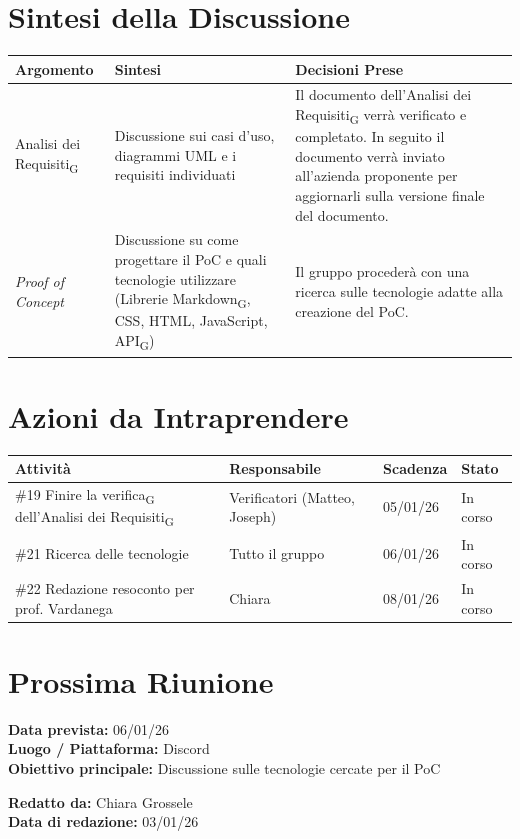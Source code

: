\documentclass[a4paper,12pt]{article}
\newcommand{\gls}[1]{#1\textsubscript{G}}
\begin{document}
\section*{ Sintesi della Discussione}

\begin{longtable}{|p{}|p{}|p{}|}
\hline
\textbf{Argomento} & \textbf{Sintesi} & \textbf{Decisioni Prese} \\ \hline
\gls{Analisi dei Requisiti} & Discussione sui casi d'uso, diagrammi UML e i requisiti individuati& Il documento dell'\gls{Analisi dei Requisiti} verrà verificato e completato. In seguito il documento verrà inviato all'azienda proponente per aggiornarli sulla versione finale del documento. \\ \hline
\textit{Proof of Concept} & Discussione su come progettare il PoC e quali tecnologie utilizzare (Librerie \gls{Markdown}, CSS, HTML, JavaScript, \gls{API})& Il gruppo procederà con una ricerca sulle tecnologie adatte alla creazione del PoC. \\ \hline
\end{longtable}


\section*{ Azioni da Intraprendere}

\begin{longtable}{|p{}|p{}|p{}|p{}|}
\hline
\textbf{Attività} & \textbf{Responsabile} & \textbf{Scadenza} & \textbf{Stato} \\ \hline
\#19 Finire la \gls{verifica} dell'\gls{Analisi dei Requisiti} &  Verificatori (Matteo, Joseph) & 05/01/26 & In corso \\ \hline
\#21 Ricerca delle tecnologie & Tutto il gruppo & 06/01/26 &  In corso\\ \hline
\#22 Redazione resoconto per prof. Vardanega & Chiara & 08/01/26 & In corso\\ \hline
\end{longtable}

\section*{ Prossima Riunione}
\textbf{Data prevista:} 06/01/26 \\
\textbf{Luogo / Piattaforma:} Discord \\
\textbf{Obiettivo principale:} Discussione sulle tecnologie cercate per il PoC


\textbf{Redatto da:} Chiara Grossele \\
\textbf{Data di redazione:} 03/01/26
\end{document}
